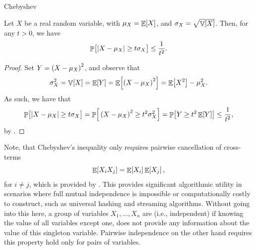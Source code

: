 \begin{fragment}{Chebyshev}
    \begin{theorem}
        Let $X$ be a real random variable, with $\mu_X = \mathop{\mathbb{E}}\!\left[ {X} \right]$, and
        $\sigma_X = \sqrt{\mathop{\mathbb{V}}\!\left[ {X} \right]}$. Then, for any $t > 0$, we have
        \begin{equation*}
            \Prob{\bigl. \cardin{X - \mu_X} \geq t \sigma_X} \leq
            \frac{1}{t^2}.
        \end{equation*}
    \end{theorem}
\end{fragment}



\begin{proof}
    Set $Y = \pth{X - \mu_X}^2$, and observe that
    \begin{equation*}
        \sigma_X^2
        =%
        \Var{X} =
        \Ex{ Y}
        =%
        \Ex{\pth{X - \mu_X}^2}
        =%
        \Ex{X^2}  - \mu_X^2.
    \end{equation*}
    As such, we have that
    \begin{equation*}
        \Prob{\bigl. \cardin{X - \mu_X}\geq t \sigma_X}%
        =%
        \Prob{\,\pth{X - \mu_X}^2\geq t^2 \sigma_X^2}
        =%
        \Prob{ Y \geq t^2 \Ex{Y}\bigl.\!}
        \leq%
        \frac{1}{t^2},
    \end{equation*}
    by .
\end{proof}

\begin{remark}
    Note, that Chebyshev's inequality only requires pairwise cancellation of
    cross-terms 
    \begin{equation*}
        \mathop{\mathbb{E}}\!\left[ {X_i X_j} \right] = \mathop{\mathbb{E}}\!\left[ {X_i} \right]\mathop{\mathbb{E}}\!\left[ {X_j} \right],
    \end{equation*}
     for $i \neq j$, which is provided by
    . This provides significant algorithmic
    utility in scenarios where full mutual independence is impossible or
    computationally costly to construct, such as universal hashing and
    streaming algorithms.  Without going into this here, a group of
    variables $X_1, \ldots, X_n$ are  (i.e.,
    independent) if knowing the value of all variables except one, does
    not provide any information about the value of this singleton
    variable. Pairwise independence on the other hand requires this
    property hold only for pairs of variables.
\end{remark}


